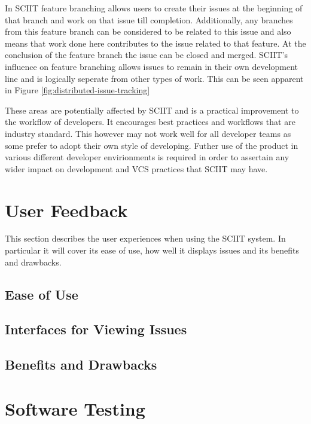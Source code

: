 \documentclass{mproj}
\begin{document}
In SCIIT feature branching allows users to create their issues at the beginning of that branch and work on that issue till completion. Additionally, any branches from this feature branch can be considered to be related to this issue and also means that work done here contributes to the issue related to that feature. At the conclusion of the feature branch the issue can be closed and merged. SCIIT's influence on feature branching allows issues to remain in their own development line and is logically seperate from other types of work. This can be seen apparent in Figure \ref{fig:distributed-issue-tracking}

These areas are potentially affected by SCIIT and is a practical improvement to the workflow of developers. It encourages best practices and workflows that are industry standard. This however may not work well for all developer teams as some prefer to adopt their own style of developing. Futher use of the product in various different developer envirionments is required in order to assertain any wider impact on development and VCS practices that SCIIT may have.



\section{User Feedback}

This section describes the user experiences when using the SCIIT system. In particular it will cover its ease of use, how well it displays issues and its benefits and drawbacks.

\subsection{Ease of Use}

\subsection{Interfaces for Viewing Issues}

\subsection{Benefits and Drawbacks}


\section{Software Testing} %
\end{document}
